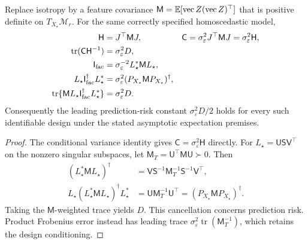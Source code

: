 \begin{corollary}
\label{cor:sharp-general-design}
Replace isotropy by a feature covariance
$\mathsf M=\mathbb E[\operatorname{vec}Z(\operatorname{vec}Z)^\top]$
that is positive definite on $T_{X_\star}\mathcal M_r$.
For the same correctly specified homoscedastic model,
\begin{align}
\mathsf H&=J^\top\mathsf M J,&
\mathsf C&=\sigma_\varepsilon^2J^\top\mathsf M J
=\sigma_\varepsilon^2\mathsf H,\\
\operatorname{tr}(\mathsf C\mathsf H^{-1})
&=\sigma_\varepsilon^2D,\\
\mathsf I_{\rm fac}
&=\sigma_\varepsilon^{-2}L_\star^*\mathsf M L_\star,\\
L_\star\mathsf I_{\rm fac}^\dagger L_\star^*
&=\sigma_\varepsilon^2
(P_{X_\star}\mathsf M P_{X_\star})^\dagger,\\
\operatorname{tr}\{\mathsf M
L_\star\mathsf I_{\rm fac}^\dagger L_\star^*\}
&=\sigma_\varepsilon^2D .
\label{eq:sharp-design-cancellation}
\end{align}
Consequently the leading prediction-risk constant
$\sigma_\varepsilon^2D/2$ holds for every such identifiable design
under the stated asymptotic expectation premises.
\end{corollary}
\begin{proof}
The conditional variance identity gives
$\mathsf C=\sigma_\varepsilon^2\mathsf H$ directly.
For $L_\star=\mathsf U\mathsf S\mathsf V^\top$ on the nonzero
singular subspaces, let
$\mathsf M_T=\mathsf U^\top\mathsf M\mathsf U\succ0$. Then
\begin{align}
(L_\star^*\mathsf M L_\star)^\dagger
&=\mathsf V\mathsf S^{-1}\mathsf M_T^{-1}
\mathsf S^{-1}\mathsf V^\top,\\
L_\star(L_\star^*\mathsf M L_\star)^\dagger L_\star^*
&=\mathsf U\mathsf M_T^{-1}\mathsf U^\top
=(P_{X_\star}\mathsf M P_{X_\star})^\dagger .
\end{align}
Taking the $\mathsf M$-weighted trace yields $D$.
This cancellation concerns prediction risk. Product Frobenius error
instead has leading trace
$\sigma_\varepsilon^2\operatorname{tr}(\mathsf M_T^{-1})$,
which retains the design conditioning.
\end{proof}

